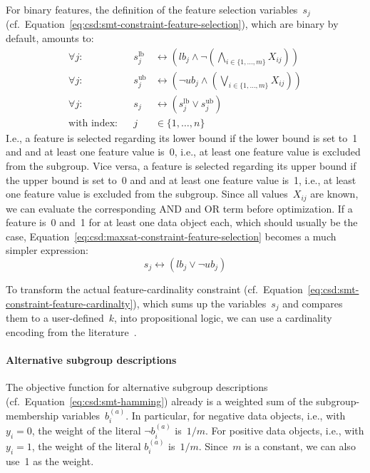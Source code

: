\documentclass{article}
\theoremstyle{definition}
\begin{document}
For binary features, the definition of the feature selection variables~$s_j$ (cf.~Equation~\ref{eq:csd:smt-constraint-feature-selection}), which are binary by default, amounts to:
%
\begin{equation}
	\begin{aligned}
		\forall j: & & s^{\text{lb}}_j &\leftrightarrow \left( \mathit{lb}_j \land \lnot \left( \bigwedge_{i \in \{1, \dots, m\}} X_{ij} \right) \right) \\
		\forall j: & &s^{\text{ub}}_j &\leftrightarrow \left( \lnot \mathit{ub}_j \land \left( \bigvee_{i \in \{1, \dots, m\}} X_{ij} \right) \right) \\
		\forall j: & & s_j &\leftrightarrow \left( s^{\text{lb}}_j \lor s^{\text{ub}}_j \right) \\
		\text{with index:} & & j &\in \{1, \dots, n\}
	\end{aligned}
	\label{eq:csd:maxsat-constraint-feature-selection}
\end{equation}
%
I.e., a feature is selected regarding its lower bound if the lower bound is set to~1 and and at least one feature value is~0, i.e., at least one feature value is excluded from the subgroup.
Vice versa, a feature is selected regarding its upper bound if the upper bound is set to~0 and and at least one feature value is~1, i.e., at least one feature value is excluded from the subgroup.
Since all values~$X_{ij}$ are known, we can evaluate the corresponding AND and OR term before optimization.
If a feature is~0 and~1 for at least one data object each, which should usually be the case, Equation~\ref{eq:csd:maxsat-constraint-feature-selection} becomes a much simpler expression:
%
\begin{equation}
		s_j \leftrightarrow \left( \mathit{lb}_j\lor \lnot \mathit{ub}_j \right)
	\label{eq:csd:maxsat-constraint-feature-selections-simplified}
\end{equation}
%

To transform the actual feature-cardinality constraint (cf.~Equation~\ref{eq:csd:smt-constraint-feature-cardinalty}), which sums up the variables~$s_j$ and compares them to a user-defined~$k$, into propositional logic, we can use a cardinality encoding from the literature~\cite{sinz2005towards}.

\paragraph{Alternative subgroup descriptions}

The objective function for alternative subgroup descriptions (cf.~Equation~\ref{eq:csd:smt-hamming}) already is a weighted sum of the subgroup-membership variables~$b_i^{(a)}$.
In particular, for negative data objects, i.e., with $y_i = 0$, the weight of the literal $\lnot b_i^{(a)}$ is~$1 / m$.
For positive data objects, i.e., with $y_i = 1$, the weight of the literal $b_i^{(a)}$ is~$1 / m$.
Since~$m$ is a constant, we can also use~1 as the weight.
\end{document}
